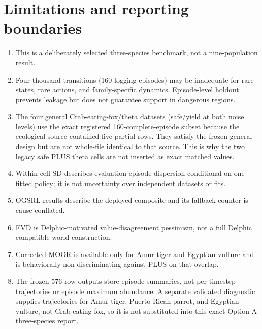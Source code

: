 \documentclass[10pt]{article}
\begin{document}
\section{Limitations and reporting boundaries}
\begin{enumerate}
\item This is a deliberately selected three-species benchmark, not a nine-population result.
\item Four thousand transitions (160 logging episodes) may be inadequate for rare states, rare
actions, and family-specific dynamics. Episode-level holdout prevents leakage but does not guarantee
support in dangerous regions.
\item The four general Crab-eating-fox/theta datasets (safe/yield at both noise levels) use the exact
registered 160-complete-episode subset because the ecological source contained five partial rows.
They satisfy the frozen general design but are not whole-file identical to that source. This is why
the two legacy safe PLUS theta cells are not inserted as exact matched values.
\item Within-cell SD describes evaluation-episode dispersion conditional on one fitted policy; it is
not uncertainty over independent datasets or fits.
\item OGSRL results describe the deployed composite and its fallback counter is cause-conflated.
\item EVD is Delphic-motivated value-disagreement pessimism, not a full Delphic compatible-world
construction.
\item Corrected MOOR is available only for Amur tiger and Egyptian vulture and is behaviorally
non-discriminating against PLUS on that overlap.
\item The frozen 576-row outputs store episode summaries, not per-timestep trajectories or episode
maximum abundance. A separate validated diagnostic supplies trajectories for Amur tiger,
Puerto Rican parrot, and Egyptian vulture, not Crab-eating fox, so it is not substituted into this
exact Option A three-species report.
\end{enumerate}
\end{document}
